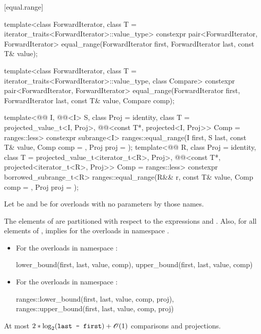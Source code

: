 [equal.range]{}

%
\begin{itemdecl}
template<class ForwardIterator, class T = iterator_traits<ForwardIterator>::value_type>
  constexpr pair<ForwardIterator, ForwardIterator>
    equal_range(ForwardIterator first,
                ForwardIterator last, const T& value);

template<class ForwardIterator, class T = iterator_traits<ForwardIterator>::value_type,
         class Compare>
  constexpr pair<ForwardIterator, ForwardIterator>
    equal_range(ForwardIterator first,
                ForwardIterator last, const T& value,
                Compare comp);

template<@@ I, @@<I> S, class Proj = identity,
         class T = projected_value_t<I, Proj>,
         @@<const T*, projected<I, Proj>> Comp = ranges::less>
  constexpr subrange<I>
    ranges::equal_range(I first, S last, const T& value, Comp comp = {}, Proj proj = {});
template<@@ R, class Proj = identity,
         class T = projected_value_t<iterator_t<R>, Proj>,
         @@<const T*, projected<iterator_t<R>, Proj>> Comp =
           ranges::less>
  constexpr borrowed_subrange_t<R>
    ranges::equal_range(R&& r, const T& value, Comp comp = {}, Proj proj = {});
\end{itemdecl}

\begin{itemdescr}
\pnum
Let  be  and
 be 
for overloads with no parameters by those names.

\pnum
\expects
The elements  of 
are partitioned with respect to the expressions
 and
.
Also, for all elements  of \tcode{[first, last)},
 implies 
for the overloads in namespace .

\pnum
\returns
\begin{itemize}
\item
For the overloads in namespace :
\begin{codeblock}
{lower_bound(first, last, value, comp),
 upper_bound(first, last, value, comp)}
\end{codeblock}
\item
For the overloads in namespace :
\begin{codeblock}
{ranges::lower_bound(first, last, value, comp, proj),
 ranges::upper_bound(first, last, value, comp, proj)}
\end{codeblock}
\end{itemize}

\pnum
\complexity
At most
$2 * \log_2(\texttt{\protect last - first}) + \mathscr{O}(1)$ comparisons and projections.
\end{itemdescr}

